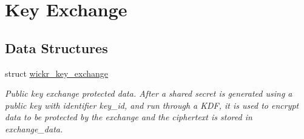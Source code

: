 \hypertarget{group__wickr__key__exchange}{}\section{Key Exchange}
\label{group__wickr__key__exchange}
\subsection*{Data Structures}
\begin{DoxyCompactItemize}
\item 
struct \mbox{\hyperlink{structwickr__key__exchange}{wickr\+\_\+key\+\_\+exchange}}
\begin{DoxyCompactList}\small\item\em Public key exchange protected data. After a shared secret is generated using a public key with identifier \textquotesingle{}key\+\_\+id\textquotesingle{}, and run through a K\+DF, it is used to encrypt data to be protected by the exchange and the ciphertext is stored in \textquotesingle{}exchange\+\_\+data\textquotesingle{}. \end{DoxyCompactList}\end{DoxyCompactItemize}
